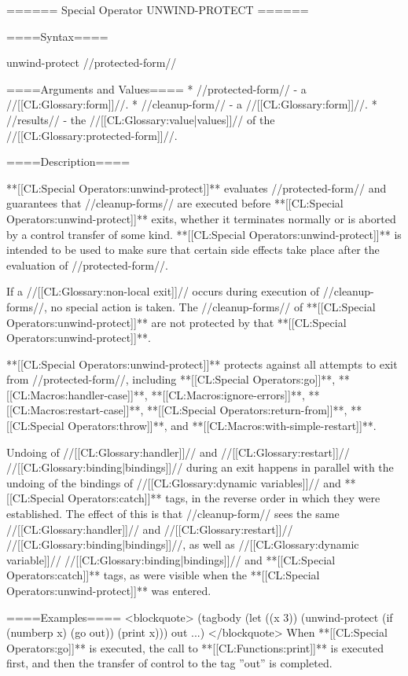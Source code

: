 ====== Special Operator UNWIND-PROTECT ======

====Syntax====

\DefspecWithValues unwind-protect {//protected-form// } {}

====Arguments and Values====
  * //protected-form// - a //[[CL:Glossary:form]]//.
  * //cleanup-form// - a //[[CL:Glossary:form]]//.
  * //results// - the //[[CL:Glossary:value|values]]// of the //[[CL:Glossary:protected-form]]//.

====Description====

**[[CL:Special Operators:unwind-protect]]** evaluates //protected-form// and guarantees that //cleanup-forms// are executed before **[[CL:Special Operators:unwind-protect]]** exits, whether it terminates normally or is aborted by a control transfer of some kind. **[[CL:Special Operators:unwind-protect]]** is intended to be used to make sure that certain side effects take place after the evaluation of //protected-form//.

If a //[[CL:Glossary:non-local exit]]// occurs during execution of //cleanup-forms//, no special action is taken. The //cleanup-forms// of **[[CL:Special Operators:unwind-protect]]** are not protected by that **[[CL:Special Operators:unwind-protect]]**.

**[[CL:Special Operators:unwind-protect]]** protects against all attempts to exit from //protected-form//, including **[[CL:Special Operators:go]]**, **[[CL:Macros:handler-case]]**, **[[CL:Macros:ignore-errors]]**, **[[CL:Macros:restart-case]]**, **[[CL:Special Operators:return-from]]**, **[[CL:Special Operators:throw]]**, and **[[CL:Macros:with-simple-restart]]**.

Undoing of //[[CL:Glossary:handler]]// and //[[CL:Glossary:restart]]// //[[CL:Glossary:binding|bindings]]// during an exit happens in parallel with the undoing of the bindings of //[[CL:Glossary:dynamic variables]]// and **[[CL:Special Operators:catch]]** tags, in the reverse order in which they were established. The effect of this is that //cleanup-form// sees the same //[[CL:Glossary:handler]]// and //[[CL:Glossary:restart]]// //[[CL:Glossary:binding|bindings]]//, as well as //[[CL:Glossary:dynamic variable]]// //[[CL:Glossary:binding|bindings]]// and **[[CL:Special Operators:catch]]** tags, as were visible when the **[[CL:Special Operators:unwind-protect]]** was entered.

====Examples==== <blockquote> (tagbody (let ((x 3)) (unwind-protect (if (numberp x) (go out)) (print x))) out ...) </blockquote> When **[[CL:Special Operators:go]]** is executed, the call to **[[CL:Functions:print]]** is executed first, and then the transfer of control to the tag ''out'' is completed.

